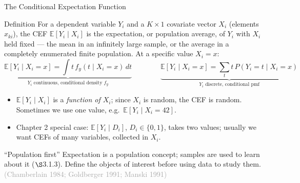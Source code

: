 \documentclass[aspectratio=169,11pt]{beamer}
\newcommand{\E}{\mathbb{E}}
\newcommand{\Src}[1]{{\scriptsize\textcolor{DarkGray}{#1}}}
\newcommand{\Sec}{\ensuremath{\S}}
\begin{document}
\begin{frame}{The Conditional Expectation Function}
\small

\begin{block}{Definition}
For a dependent variable $Y_i$ and a $K\times1$ covariate vector $X_i$
(elements $x_{ki}$), the CEF $\E[Y_i\mid X_i]$ is the expectation, or
population average, of $Y_i$ with $X_i$ held fixed --- the mean in an
infinitely large sample, or the average in a completely enumerated finite
population. At a specific value $X_i=x$:
\[
\underbrace{\E[Y_i\mid X_i=x] = \int t\, f_y(t\mid X_i=x)\,dt}_{Y_i \text{ continuous, conditional density } f_y}
\qquad\qquad
\underbrace{\E[Y_i\mid X_i=x] = \sum_t t\, P(Y_i=t\mid X_i=x)}_{Y_i \text{ discrete, conditional pmf}}
\]
\end{block}

\begin{itemize}
    \item $\E[Y_i\mid X_i]$ is a \emph{function of $X_i$}; since $X_i$ is
    random, the CEF is random. Sometimes we use one value, e.g.\
    $\E[Y_i\mid X_i=42]$.
    \item Chapter 2 special case: $\E[Y_i\mid D_i]$, $D_i\in\{0,1\}$, takes
    two values; usually we want CEFs of many variables, collected in $X_i$.
\end{itemize}

\begin{block}{``Population first''}
Expectation is a population concept; samples are used to learn about it
(\Sec{}3.1.3). \alert{Define the objects of interest before
using data to study them.} \Src{(Chamberlain 1984; Goldberger 1991; Manski 1991)}
\end{block}

\end{frame}
\end{document}
